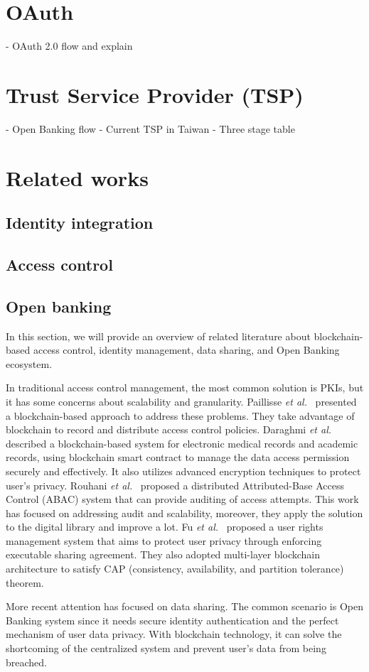 \newpage

\section{OAuth}
- OAuth 2.0 flow and explain

\newpage

\section{Trust Service Provider (TSP)}
- Open Banking flow
- Current TSP in Taiwan
- Three stage table

\newpage

\section{Related works}

\subsection{Identity integration}
\subsection{Access control}
\subsection{Open banking}
In this section, we will provide an overview of related literature about blockchain-based access control, identity management, data sharing, and Open Banking ecosystem.\par
In traditional access control management, the most common solution is PKIs, but it has some concerns about scalability and granularity. Paillisse \emph{et al.}~\cite{paillisse2019distributed} presented a blockchain-based approach to address these problems. They take advantage of blockchain to record and distribute access control policies. Daraghmi \emph{et al.}~\cite{daraghmi2019medchain,daraghmi2019unichain} described a blockchain-based system for electronic medical records and academic records, using blockchain smart contract to manage the data access permission securely and effectively. It also utilizes advanced encryption techniques to protect user's privacy. 
Rouhani \emph{et al.}~\cite{rouhani2020distributed} proposed a distributed Attributed-Base Access Control (ABAC) system that can provide auditing of access attempts. This work has focused on addressing audit and scalability, moreover, they apply the solution to the digital library and improve a lot.
Fu \emph{et al.}~\cite{fu2020soteria} proposed a user rights management system that aims to protect user privacy through enforcing executable sharing agreement. They also adopted multi-layer blockchain architecture to satisfy CAP (consistency, availability, and partition tolerance) theorem.\par

More recent attention has focused on data sharing. The common scenario is Open Banking system since it needs secure identity authentication and the perfect mechanism of user data privacy. With blockchain technology, it can solve the shortcoming of the centralized system and prevent user's data from being breached.